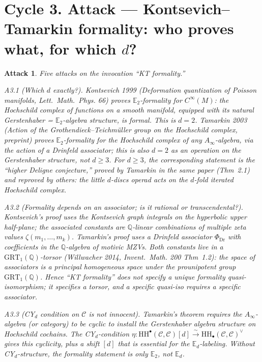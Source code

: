\documentclass[11pt]{article}
\newtheorem*{attack}{Attack}
\theoremstyle{definition}
\providecommand{\QQ}{\mathbb{Q}}
\providecommand{\HH}{\mathrm{HH}}
\providecommand{\cC}{\mathcal{C}}
\begin{document}
\section*{Cycle 3. Attack --- Kontsevich--Tamarkin formality: who proves what, for which $d$?}

\begin{attack}
Five attacks on the invocation ``KT formality.''

\emph{A3.1 (Which $d$ exactly?).} Kontsevich 1999 (\emph{Deformation
quantization of Poisson manifolds}, \emph{Lett.~Math.~Phys.} 66)
proves $\mathbb{E}_2$-formality for $C^\infty(M)$: the Hochschild
complex of functions on a smooth manifold, equipped with its natural
Gerstenhaber = $\mathbb{E}_2$-algebra structure, is formal. This is
$d = 2$. Tamarkin 2003 (\emph{Action of the Grothendieck--Teichm\"uller
group on the Hochschild complex}, preprint) proves
$\mathbb{E}_2$-formality for the Hochschild complex of any
$A_\infty$-algebra, via the action of a Drinfeld associator; this is
also $d = 2$ \emph{as an operation on the Gerstenhaber structure},
not $d \geq 3$. For $d \geq 3$, the corresponding statement is the
``higher Deligne conjecture,'' proved by Tamarkin in the same paper
(Thm~2.1) and reproved by others: the little $d$-discs operad acts on
the $d$-fold iterated Hochschild complex.

\emph{A3.2 (Formality depends on an associator; is it rational or
transcendental?).} Kontsevich's proof uses the Kontsevich graph
integrals on the hyperbolic upper half-plane; the associated constants
are $\QQ$-linear combinations of multiple zeta values $\zeta(m_1, \ldots,
m_k)$. Tamarkin's proof uses a Drinfeld associator $\Phi_{\mathrm{Dr}}$
with coefficients in the $\QQ$-algebra of motivic MZVs. Both
constants live in a $\mathrm{GRT}_1(\QQ)$-torsor
(Willwacher 2014, \emph{Invent.~Math.} 200 Thm~1.2): the space of
associators is a principal homogeneous space under the prounipotent
group $\mathrm{GRT}_1(\QQ)$. Hence ``KT formality'' does not specify a
unique formality quasi-isomorphism; it specifies a torsor, and a
specific quasi-iso requires a specific associator.

\emph{A3.3 (CY$_d$ condition on $\cC$ is not innocent).} Tamarkin's
theorem requires the $A_\infty$-algebra (or category) to be
\emph{cyclic} to install the Gerstenhaber algebra structure on
Hochschild cochains. The CY$_d$-condition
$\eta\colon \HH^\bullet(\cC,\cC)[d] \xrightarrow{\sim} \HH_\bullet(\cC,\cC)^\vee$
gives this cyclicity, plus a shift $[d]$ that is essential for the
$\mathbb{E}_d$-labeling. Without CY$_d$-structure, the formality
statement is only $\mathbb{E}_2$, not $\mathbb{E}_d$.


\end{attack}
\end{document}
